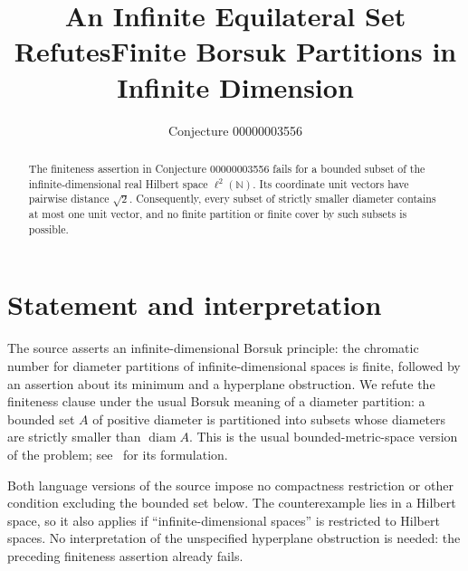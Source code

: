 \documentclass[11pt]{article}
\title{An Infinite Equilateral Set Refutes\newline Finite Borsuk Partitions in Infinite Dimension}
\author{Conjecture 00000003556}
\date{}
\newcommand{\diam}{\operatorname{diam}}
\begin{document}
\maketitle
\begin{abstract}
The finiteness assertion in Conjecture 00000003556 fails for a bounded subset of the infinite-dimensional real Hilbert space $\ell^2(\mathbb N)$. Its coordinate unit vectors have pairwise distance $\sqrt2$. Consequently, every subset of strictly smaller diameter contains at most one unit vector, and no finite partition or finite cover by such subsets is possible.
\end{abstract}

\section*{Statement and interpretation}
The source asserts an infinite-dimensional Borsuk principle: the chromatic number for diameter partitions of infinite-dimensional spaces is finite, followed by an assertion about its minimum and a hyperplane obstruction. We refute the finiteness clause under the usual Borsuk meaning of a diameter partition: a bounded set $A$ of positive diameter is partitioned into subsets whose diameters are strictly smaller than $\diam A$. This is the usual bounded-metric-space version of the problem; see~\cite{IvanovTuzhilin} for its formulation.

Both language versions of the source impose no compactness restriction or other condition excluding the bounded set below. The counterexample lies in a Hilbert space, so it also applies if ``infinite-dimensional spaces'' is restricted to Hilbert spaces. No interpretation of the unspecified hyperplane obstruction is needed: the preceding finiteness assertion already fails.
\end{document}
